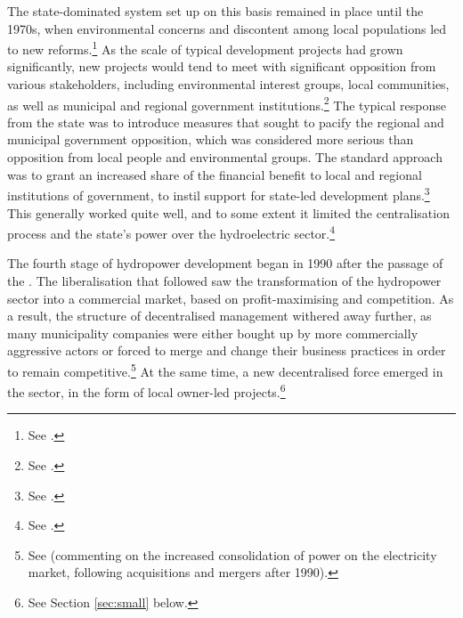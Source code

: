 The state-dominated system set up on this 
basis remained in place until the 1970s, when environmental concerns and discontent among local populations led to new reforms.\footnote{See \cite[71-75]{thue96}.} As the scale of typical development projects had grown significantly, new projects would tend to meet with significant opposition from various stakeholders, including environmental interest groups, local communities, as well as municipal and regional government institutions.\footnote{See \cite[71-72]{thue96}.} The typical response from the state was to introduce measures that sought to pacify the regional and municipal government opposition, which was considered more serious than opposition from local people and environmental groups. The standard approach was to grant an increased share of the financial benefit to local and regional institutions of government, to instil support for state-led development plans.\footnote{See \cite[73-76]{nilsen08}.} This generally worked quite well, and to some extent it limited the centralisation process and the state's power over the hydroelectric sector.\footnote{See \cite[85]{thue96}.}

The fourth stage of hydropower development began in 1990 after the passage of the \cite{ea90}. The liberalisation that followed saw the transformation of the hydropower sector into a commercial market, based on profit-maximising and competition. As a result, the structure of decentralised management withered away further, as many municipality companies were either bought up by more commercially aggressive actors or forced to merge and change their business practices in order to remain competitive.\footnote{See \cite[583]{bibow03} (commenting on the increased consolidation of power on the electricity market, following acquisitions and mergers after 1990).} At the same time, a new decentralised force emerged in the sector, in the form of local owner-led projects.\footnote{See Section \ref{sec:small} below.}


